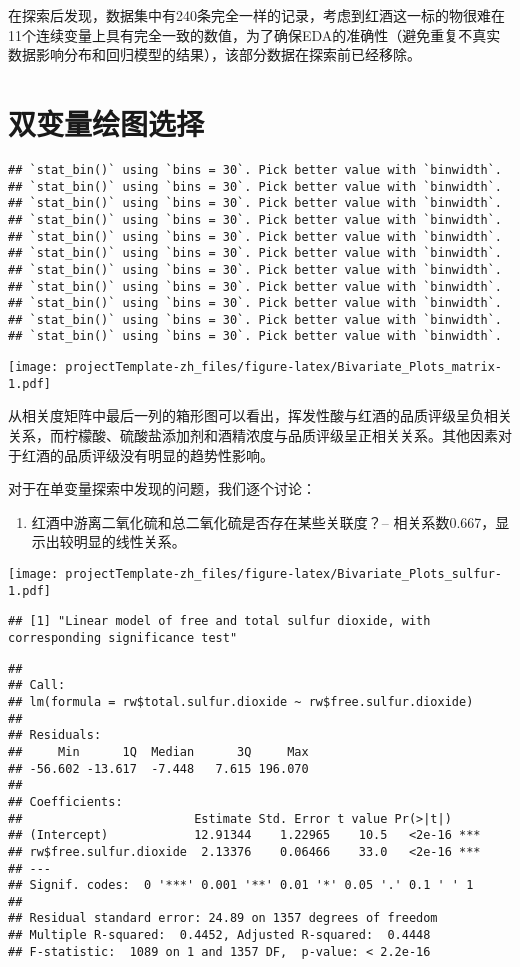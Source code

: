\documentclass[]{article}
\providecommand{\tightlist}{%
  \setlength{\itemsep}{0pt}\setlength{\parskip}{0pt}}
\begin{document}
在探索后发现，数据集中有240条完全一样的记录，考虑到红酒这一标的物很难在11个连续变量上具有完全一致的数值，为了确保EDA的准确性（避免重复不真实数据影响分布和回归模型的结果），该部分数据在探索前已经移除。

\section{双变量绘图选择}

\begin{verbatim}
## `stat_bin()` using `bins = 30`. Pick better value with `binwidth`.
## `stat_bin()` using `bins = 30`. Pick better value with `binwidth`.
## `stat_bin()` using `bins = 30`. Pick better value with `binwidth`.
## `stat_bin()` using `bins = 30`. Pick better value with `binwidth`.
## `stat_bin()` using `bins = 30`. Pick better value with `binwidth`.
## `stat_bin()` using `bins = 30`. Pick better value with `binwidth`.
## `stat_bin()` using `bins = 30`. Pick better value with `binwidth`.
## `stat_bin()` using `bins = 30`. Pick better value with `binwidth`.
## `stat_bin()` using `bins = 30`. Pick better value with `binwidth`.
## `stat_bin()` using `bins = 30`. Pick better value with `binwidth`.
## `stat_bin()` using `bins = 30`. Pick better value with `binwidth`.
\end{verbatim}

\texttt{[image: projectTemplate-zh\_files/figure-latex/Bivariate\_Plots\_matrix-1.pdf]}

从相关度矩阵中最后一列的箱形图可以看出，挥发性酸与红酒的品质评级呈负相关关系，而柠檬酸、硫酸盐添加剂和酒精浓度与品质评级呈正相关关系。其他因素对于红酒的品质评级没有明显的趋势性影响。

对于在单变量探索中发现的问题，我们逐个讨论：

\begin{enumerate}
\def\labelenumi{\arabic{enumi}.}
\tightlist
\item
  红酒中游离二氧化硫和总二氧化硫是否存在某些关联度？--
  相关系数0.667，显示出较明显的线性关系。
\end{enumerate}

\texttt{[image: projectTemplate-zh\_files/figure-latex/Bivariate\_Plots\_sulfur-1.pdf]}

\begin{verbatim}
## [1] "Linear model of free and total sulfur dioxide, with corresponding significance test"
\end{verbatim}

\begin{verbatim}
## 
## Call:
## lm(formula = rw$total.sulfur.dioxide ~ rw$free.sulfur.dioxide)
## 
## Residuals:
##     Min      1Q  Median      3Q     Max 
## -56.602 -13.617  -7.448   7.615 196.070 
## 
## Coefficients:
##                        Estimate Std. Error t value Pr(>|t|)    
## (Intercept)            12.91344    1.22965    10.5   <2e-16 ***
## rw$free.sulfur.dioxide  2.13376    0.06466    33.0   <2e-16 ***
## ---
## Signif. codes:  0 '***' 0.001 '**' 0.01 '*' 0.05 '.' 0.1 ' ' 1
## 
## Residual standard error: 24.89 on 1357 degrees of freedom
## Multiple R-squared:  0.4452, Adjusted R-squared:  0.4448 
## F-statistic:  1089 on 1 and 1357 DF,  p-value: < 2.2e-16
\end{verbatim}
\end{document}
